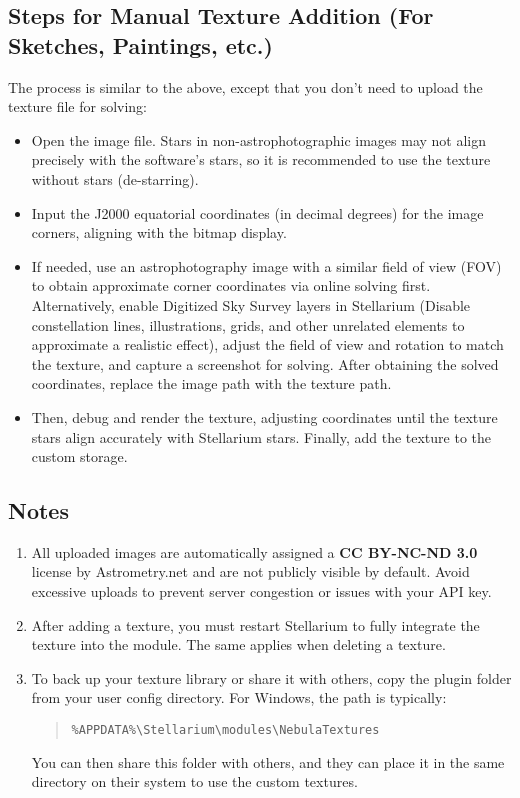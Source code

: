 \subsection{Steps for Manual Texture Addition (For Sketches, Paintings, etc.)}
The process is similar to the above, except that you don’t need to upload the texture file for solving:
\begin{itemize}
    \item Open the image file. Stars in non-astrophotographic images may not align precisely with the 
	software's stars, so it is recommended to use the texture without stars (de-starring).
    \item Input the J2000 equatorial coordinates (in decimal degrees) for the image corners, aligning 
	with the bitmap display.
    \item If needed, use an astrophotography image with a similar field of view (FOV) to obtain 
	approximate corner coordinates via online solving first. Alternatively, enable Digitized 
	Sky Survey layers in Stellarium (Disable constellation lines, illustrations, grids, and other 
	unrelated elements to approximate a realistic effect), adjust the field of view and rotation 
	to match the texture, and capture a screenshot for solving. After obtaining the solved 
	coordinates, replace the image path with the texture path.
    \item Then, debug and render the texture, adjusting coordinates until the texture stars align 
	accurately with Stellarium stars. Finally, add the texture to the custom storage.
\end{itemize}

\subsection{Notes}
\begin{enumerate}
    \item All uploaded images are automatically assigned a \textbf{CC BY-NC-ND 3.0} license by Astrometry.net 
	and are not publicly visible by default. Avoid excessive uploads to prevent server 
	congestion or issues with your API key.
    \item After adding a texture, you must restart Stellarium to fully integrate the texture into the 
	module. The same applies when deleting a texture.
    \item To back up your texture library or share it with others, copy the plugin folder from your user 
	config directory. For Windows, the path is typically:
    \begin{quote}
    \texttt{\%APPDATA\%\textbackslash Stellarium\textbackslash modules\textbackslash NebulaTextures}
    \end{quote}
    You can then share this folder with others, and they can place it in the same directory on 
	their system to use the custom textures.
\end{enumerate}



